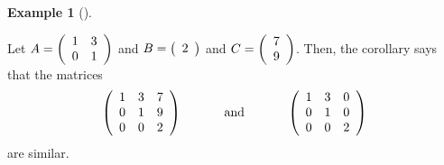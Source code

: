 \documentclass[numbers=enddot,12pt,final,onecolumn,notitlepage]{scrartcl}%
\numberwithin{exer}{subsection}
\theoremstyle{definition}
\newtheorem{exam}[theo]{Example}
\newenvironment{example}[1][]
{\begin{exam}[#1]\begin{leftbar}}
{\end{leftbar}\end{exam}}
\begin{document}
\begin{example}
Let $A=\left(
\begin{array}
[c]{cc}%
1 & 3\\
0 & 1
\end{array}
\right)  $ and $B=\left(
\begin{array}
[c]{c}%
2
\end{array}
\right)  $ and $C=\left(
\begin{array}
[c]{c}%
7\\
9
\end{array}
\right)  $. Then, the corollary says that the matrices%
\[
\left(
\begin{array}
[c]{ccc}%
1 & 3 & 7\\
0 & 1 & 9\\
0 & 0 & 2
\end{array}
\right)  \ \ \ \ \ \ \ \ \ \ \text{and}\ \ \ \ \ \ \ \ \ \ \left(
\begin{array}
[c]{ccc}%
1 & 3 & 0\\
0 & 1 & 0\\
0 & 0 & 2
\end{array}
\right)
\]
are similar.
\end{example}
\end{document}
